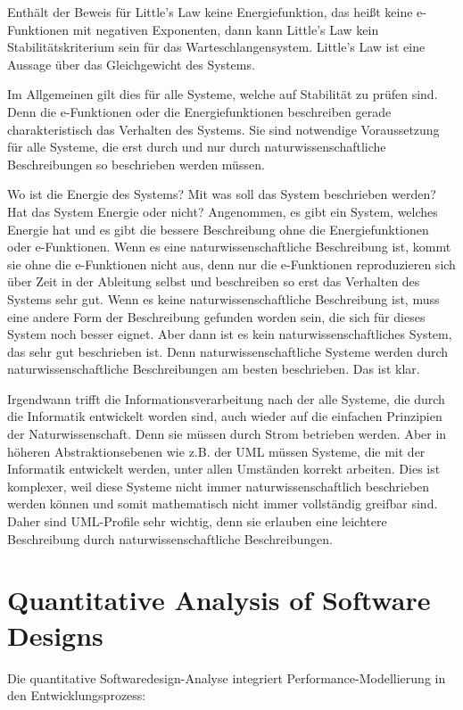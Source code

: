 ﻿\documentclass[a4paper,12pt]{report}
\theoremstyle{definition}
\begin{document}
Enthält der Beweis für Little's Law keine Energiefunktion, das heißt keine e-Funktionen mit negativen Exponenten, dann kann Little's Law kein Stabilitätskriterium sein für das Warteschlangensystem. Little's Law ist eine Aussage über das Gleichgewicht des Systems.

Im Allgemeinen gilt dies für alle Systeme, welche auf Stabilität zu prüfen sind. Denn die e-Funktionen oder die Energiefunktionen beschreiben gerade charakteristisch das Verhalten des Systems. Sie sind notwendige Voraussetzung für alle Systeme, die erst durch und nur durch naturwissenschaftliche Beschreibungen so beschrieben werden müssen.

Wo ist die Energie des Systems? Mit was soll das System beschrieben werden? Hat das System Energie oder nicht? Angenommen, es gibt ein System, welches Energie hat und es gibt die bessere Beschreibung ohne die Energiefunktionen oder e-Funktionen. Wenn es eine naturwissenschaftliche Beschreibung ist, kommt sie ohne die e-Funktionen nicht aus, denn nur die e-Funktionen reproduzieren sich über Zeit in der Ableitung selbst und beschreiben so erst das Verhalten des Systems sehr gut. Wenn es keine naturwissenschaftliche Beschreibung ist, muss eine andere Form der Beschreibung gefunden worden sein, die sich für dieses System noch besser eignet. Aber dann ist es kein naturwissenschaftliches System, das sehr gut beschrieben ist. Denn naturwissenschaftliche Systeme werden durch naturwissenschaftliche Beschreibungen am besten beschrieben. Das ist klar.

Irgendwann trifft die Informationsverarbeitung nach der alle Systeme, die durch die Informatik entwickelt worden sind, auch wieder auf die einfachen Prinzipien der Naturwissenschaft. Denn sie müssen durch Strom betrieben werden. Aber in höheren Abstraktionsebenen wie z.B. der UML müssen Systeme, die mit der Informatik entwickelt werden, unter allen Umständen korrekt arbeiten. Dies ist komplexer, weil diese Systeme nicht immer naturwissenschaftlich beschrieben werden können und somit mathematisch nicht immer vollständig greifbar sind. Daher sind UML-Profile sehr wichtig, denn sie erlauben eine leichtere Beschreibung durch naturwissenschaftliche Beschreibungen.

\section{Quantitative Analysis of Software Designs}

Die quantitative Softwaredesign-Analyse \cite{smith1990} integriert Performance-Modellierung in den Entwicklungsprozess:
\end{document}
